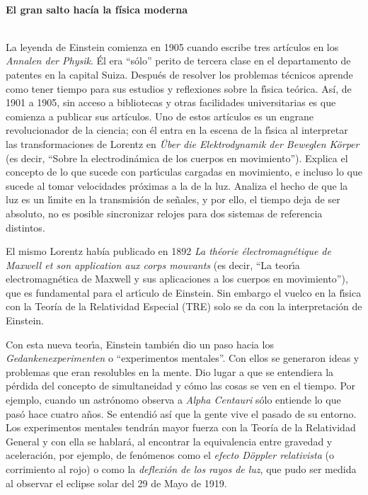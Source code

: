 \documentclass[12pt]{article}
\begin{document}
\ \\
\textbf{\large El gran salto hacía la física moderna}

\ \\
La leyenda de Einstein comienza en 1905 cuando escribe tres artículos en los {\it Annalen der Physik}. Él era ``sólo'' perito de tercera clase en el departamento de patentes en la capital Suiza. Despu\'es de resolver los problemas t\'ecnicos aprende como tener tiempo para sus estudios y reflexiones sobre la f\'{\i}sica te\'orica. Así, de 1901 a 1905, sin acceso a bibliotecas y otras facilidades universitarias es que comienza a publicar sus artículos. Uno de estos artículos es un engrane revolucionador de la ciencia; con él entra en la escena de la f\'{\i}sica al interpretar las transformaciones de Lorentz en \textit{\"Uber die Elektrodynamik der Beweglen K\"orper} (es decir, {``Sobre la electrodin\'amica de los cuerpos en movimiento''}). Explica el concepto de lo que sucede con part\'{\i}culas cargadas en movimiento, e incluso lo que sucede al tomar velocidades próximas a la de la luz. Analiza el hecho de que la luz es un l\'{\i}mite en la transmisión de se\~nales, y por ello, el tiempo deja de ser absoluto, no es posible sincronizar relojes para dos sistemas de referencia distintos.

El mismo Lorentz había publicado en 1892 {\it La th\'eorie \'electromagn\'etique de Maxwell et son application aux corps mouvants} (es decir, ``La teor\'{\i}a electromagn\'etica de Maxwell y sus aplicaciones a los cuerpos en movimiento''), que es fundamental para el art\'{\i}culo de Einstein. Sin embargo el vuelco en la f\'{\i}sica con la Teoría de la Relatividad Especial (TRE) solo se da con la interpretación de Einstein.

Con esta nueva teor\'{\i}a, Einstein también dio un paso hacia los \textit{Gedankenexperimenten} o ``experimentos mentales''. Con ellos se generaron ideas y problemas que eran resolubles en la mente. Dio lugar a que se entendiera la pérdida del concepto de simultaneidad y c\'omo las cosas se ven en el tiempo. Por ejemplo, cuando un astrónomo observa a {\it Alpha Centauri} s\'olo entiende lo que pas\'o hace cuatro a\~nos. Se entendió así que la gente vive el pasado de su entorno. Los experimentos mentales tendrán mayor fuerza con la Teoría de la Relatividad General y con ella se hablará, al encontrar la equivalencia entre gravedad y aceleración, por ejemplo, de fenómenos como el \emph{efecto Döppler relativista} (o corrimiento al rojo) o como la \emph{deflexión de los rayos de luz}, que pudo ser medida al observar el eclipse solar del 29 de Mayo de 1919. 
\end{document}
